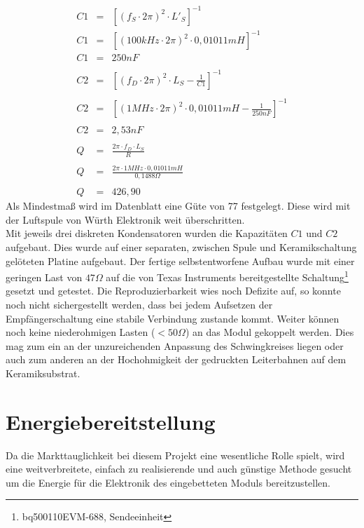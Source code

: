 \documentclass[12pt]{scrreprt} %
\begin{document}
\begin{eqnarray}
C1&=&\left[\left(f_S \cdot 2\pi\right)^2 \cdot L'_S\right]^{-1}\\
C1&=&\left[\left(100kHz \cdot 2\pi\right)^2 \cdot 0,01011mH\right]^{-1}\\
C1&=&250nF\\
\nonumber\\
C2&=&\left[\left(f_D \cdot 2\pi\right)^2 \cdot L_S-\frac 1{C1}\right]^{-1}\\
\nonumber\\
C2&=&\left[\left(1MHz \cdot 2\pi\right)^2 \cdot 0,01011mH-\frac 1{250nF}\right]^{-1}\\
\nonumber\\
C2&=&2,53nF\\
\nonumber\\
Q&=&\frac{2\pi \cdot f_D \cdot L_S}{R}\\
\nonumber\\
Q&=&\frac{2\pi \cdot 1MHz \cdot 0,01011mH}{0,1488 \Omega}\\
\nonumber\\
Q&=&426,90
\end{eqnarray}
Als Mindestmaß wird im Datenblatt \citep[siehe S.23]{BQ51013} eine Güte von 77 festgelegt. Diese wird mit der Luftspule von Würth Elektronik weit überschritten.\\
Mit jeweils drei %
diskreten Kondensatoren wurden die Kapazitäten $C1$ und $C2$ aufgebaut. Dies wurde auf einer separaten, zwischen Spule und Keramikschaltung gelöteten Platine aufgebaut. Der fertige selbstentworfene Aufbau wurde mit einer geringen Last von $47 \Omega$ %
auf die von Texas Instruments bereitgestellte Schaltung\footnote{bq500110EVM-688, Sendeeinheit} gesetzt und getestet. Die Reproduzierbarkeit wies noch Defizite auf, so konnte noch nicht sichergestellt werden, dass bei jedem Aufsetzen der Empfängerschaltung eine stabile Verbindung zustande kommt. Weiter können noch keine niederohmigen Lasten ($<50 \Omega$) an das Modul gekoppelt werden. Dies mag zum ein an der unzureichenden Anpassung des Schwingkreises liegen oder auch zum anderen an der Hochohmigkeit der gedruckten Leiterbahnen auf dem Keramiksubstrat. 
\section{Energiebereitstellung}
\label{chap:4.2}
Da die Markttauglichkeit bei diesem Projekt eine wesentliche Rolle spielt, wird eine weitverbreitete, einfach zu realisierende und auch günstige Methode gesucht um die Energie für die Elektronik des eingebetteten Moduls bereitzustellen.
\end{document}
